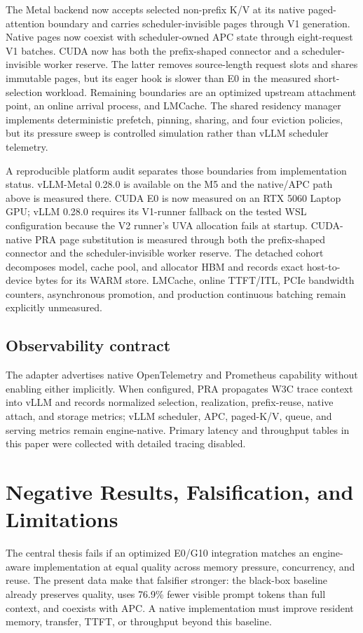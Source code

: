 \documentclass[10pt]{article}
\begin{document}
The Metal backend now accepts selected non-prefix K/V at its native
paged-attention boundary and carries scheduler-invisible pages through V1
generation. Native pages now coexist with scheduler-owned APC state through
eight-request V1 batches. CUDA now has both the prefix-shaped connector and a
scheduler-invisible worker reserve. The latter removes source-length request
slots and shares immutable pages, but its eager hook is slower than E0 in the
measured short-selection workload. Remaining boundaries are an optimized
upstream attachment point, an online arrival process, and LMCache. The shared residency manager
implements deterministic prefetch, pinning, sharing, and four eviction
policies, but its pressure sweep is controlled simulation rather than vLLM
scheduler telemetry.

A reproducible platform audit separates those boundaries from implementation
status. vLLM-Metal 0.28.0 is available on the M5 and the native/APC path above
is measured there. CUDA E0 is now measured on an RTX 5060 Laptop GPU; vLLM
0.28.0 requires its V1-runner fallback on the tested WSL configuration because
the V2 runner's UVA allocation fails at startup. CUDA-native PRA page
substitution is measured through both the prefix-shaped connector and the
scheduler-invisible worker reserve. The detached cohort decomposes model, cache
pool, and allocator HBM and records exact host-to-device bytes for its WARM
store. LMCache, online TTFT/ITL, PCIe bandwidth counters, asynchronous
promotion, and production continuous batching remain explicitly unmeasured.

\subsection{Observability contract}

The adapter advertises native OpenTelemetry and Prometheus capability without
enabling either implicitly.  When configured, PRA propagates W3C trace context
into vLLM and records normalized selection, realization, prefix-reuse, native
attach, and storage metrics; vLLM scheduler, APC, paged-K/V, queue, and serving
metrics remain engine-native.  Primary latency and throughput tables in this
paper were collected with detailed tracing disabled.

\section{Negative Results, Falsification, and Limitations}
The central thesis fails if an optimized E0/G10 integration matches an
engine-aware implementation at equal quality across memory pressure,
concurrency, and reuse. The present data make that falsifier stronger: the
black-box baseline already preserves quality, uses 76.9\% fewer visible prompt
tokens than full context, and coexists with APC. A native implementation must
improve resident memory, transfer, TTFT, or throughput beyond this baseline.
\end{document}
